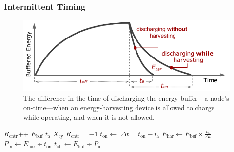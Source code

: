 \subsubsection{Intermittent Timing}
\label{subsec:interTimer}
%
\begin{figure}[t]
		\centering
		\includegraphics[width=\columnwidth]{figures/softwareClock}
		\caption{The difference in the time of discharging the energy buffer---a node's on-time---when an energy-harvesting device is allowed to charge while operating, and when it is not allowed.}
		\label{fig:softwareClock}
\end{figure} 
\begin{algorithm}[t]
    \label{algo:offTime}
    \small
    \begin{algorithmic}[1]
		\State $R_\text{cntr}\text{++}$    \label{lin:i}
		\State $E_\text{buf}$ 
		\State $t_\text{a}$ \label{lin:ta}
		\State$ X_\text{cy} $  
		    \State $R_\text{cntr}=-1$
			\State {}  \label{lin:fixedLoad}
			\State $t_\text{on} \leftarrow$  \label{lin:ton}
		\EndIf
			\State \label{lin:deltat}$\Delta{t} = t_\text{on}-t_\text{a}$   \label{lin:td}
			\State \label{lin:ehar}$E_\text{har} \leftarrow E_\text{buf}\times \frac{t_\text{a}}{\Delta{t}}$ 
			\State $P_\text{in} \leftarrow E_\text{har}\div{t_\text{on}}$  \label{lin:pin}
			\State \label{lin:offtime}$t_\text{off} \leftarrow E_\text{buf}\div P_\text{in}$ 
		\EndIf
	\end{algorithmic}
\end{algorithm}

